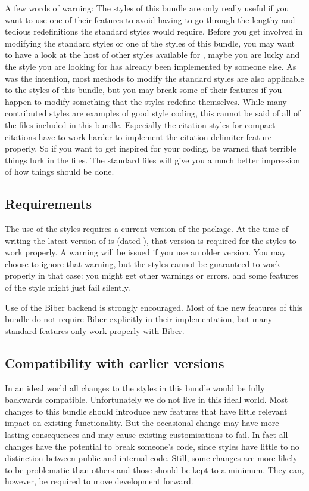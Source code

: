 \documentclass[DIV=9]{scrartcl}
\makeatletter
\newcommand*{\biblatexversion}{\extblx@requiredbiblatexversion}
\newcommand*{\biblatexdate}{\extblx@requiredbiblatexdate}
\newcommand*{\biber}{Biber}
\makeatother
\begin{document}
A few words of warning:
The styles of this bundle are only really useful if you want to use one of their
features to avoid having to go through the lengthy and tedious redefinitions the
standard styles would require.
Before you get involved in modifying the standard styles or one of the styles
of this bundle, you may want to have a look at the host of other styles
available for ,
maybe you are lucky and the style you are looking for has already been
implemented by someone else.
As was the intention, most methods to modify the standard styles are also
applicable to the styles of this bundle, but you may break some of their
features if you happen to modify something that the  styles
redefine themselves.
While many contributed  styles are examples of good 
style coding, this cannot be said of all of the files included in this bundle.
Especially the citation styles for compact citations have to work harder
to implement the citation delimiter feature properly.
So if you want to get inspired for your  coding, be warned that
terrible things lurk in the  files.
The standard  files will give you a much better impression of how
things should be done.


\subsection{Requirements}\label{sec:req}
The use of the styles requires a current version of the  package.
At the time of writing the latest version of  is
\biblatexversion{} (dated \biblatexdate),
that version is required for the styles to work properly.
A warning will be issued if you use an older version.
You may choose to ignore that warning, but the styles cannot be guaranteed to
work properly in that case:
you might get other warnings or errors, and some features of the style might
just fail silently.

Use of the \biber{} backend is strongly encouraged.
Most of the new features of this bundle do not require \biber{} explicitly in
their implementation, but many  standard features only work
properly with \biber{}.

\subsection{Compatibility with earlier versions}\label{sec:backw}
In an ideal world all changes to the styles in this bundle would be fully
backwards compatible. Unfortunately we do not live in this ideal world.
Most changes to this bundle should introduce new features that have little
relevant impact on existing functionality. But the occasional change
may have more lasting consequences and may cause existing customisations to
fail.
In fact all changes have the potential to break someone's code, since
 styles have little to no distinction between public and internal
code.
Still, some changes are more likely to be problematic than others and those
should be kept to a minimum. They can, however, be required to move development
forward.
\end{document}
